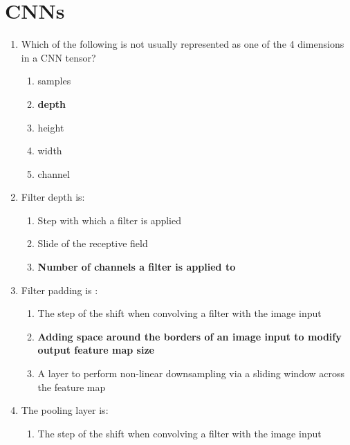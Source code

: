 \documentclass{report}
\numberwithin{equation}{section}
\begin{document}
\section{CNNs}
\begin{enumerate}
    \item Which of the following is not usually represented as one of the 4 dimensions in a CNN tensor?
    \begin{enumerate}[label=\alph*.]
        \item samples
        \item \textbf{depth}
        \item height
        \item width
        \item channel
    \end{enumerate}
    \item Filter depth is:
    \begin{enumerate}[label=\alph*.]
        \item Step with which a filter is applied
        \item Slide of the receptive field
        \item \textbf{Number of channels a filter is applied to}
    \end{enumerate}
    \item Filter padding is :
    \begin{enumerate}[label=\alph*.]
        \item The step of the shift when convolving a filter with the image input
        \item \textbf{Adding space around the borders of an image input to modify output feature map size}
        \item A layer to perform non-linear downsampling via a sliding window across the feature map
    \end{enumerate}
    \item The pooling layer is:
    \begin{enumerate}[label=\alph*.]
        \item The step of the shift when convolving a filter with the image input

\end{enumerate}
\end{enumerate}
\end{document}
